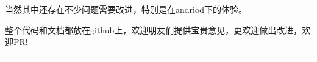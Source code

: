 \documentclass[11pt,twoside]{article} %
\begin{document}
当然其中还存在不少问题需要改进，特别是在andriod下的体验。

整个代码和文档都放在github上，欢迎朋友们提供宝贵意见，更欢迎做出改进，欢迎PR!






%


\vspace{1cm}
\noindent\rule{\linewidth}{3pt}
{}
\tableofcontents
{}
\listoffigures
{}
{}
\listofegcode
\end{document}
